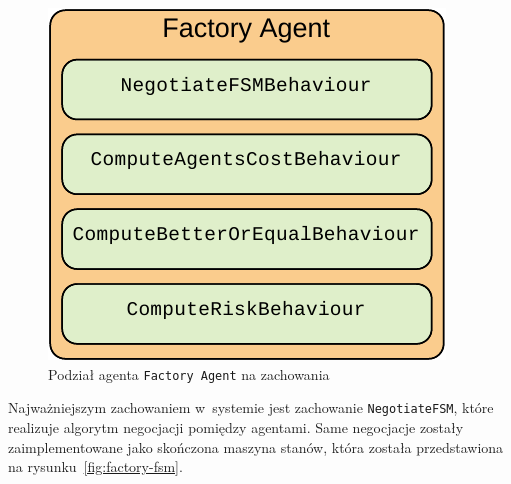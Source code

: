 \begin{figure}[h]
    \centering
    \includegraphics[width=0.8\columnwidth]{figures/SAG-Factory-Behaviours.pdf}
    \caption{Podział agenta \texttt{Factory Agent} na zachowania}
    \label{fig:factory-behaviours}
\end{figure}

Najważniejszym zachowaniem w~systemie jest zachowanie \texttt{NegotiateFSM}, które realizuje algorytm negocjacji pomiędzy agentami. Same negocjacje zostały zaimplementowane jako skończona maszyna stanów, która została przedstawiona na rysunku~\ref{fig:factory-fsm}.

